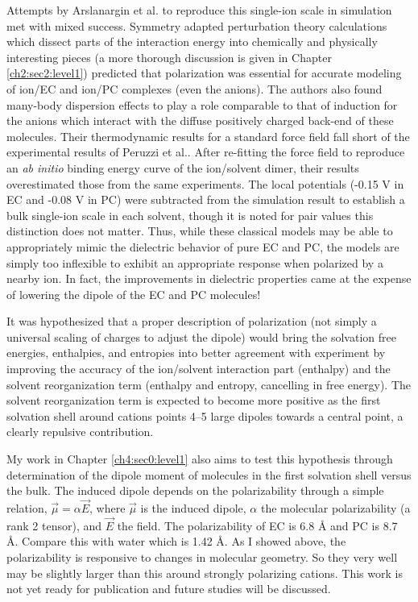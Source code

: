 \begin{intro}
   Attempts by Arslanargin et al. to reproduce this single-ion scale in simulation met with mixed success\cite{ayse2016ecpc}. Symmetry adapted perturbation theory calculations 
   which dissect parts of the interaction energy into chemically and physically interesting pieces (a more thorough discussion is given in Chapter \ref{ch2:sec2:level1}) 
   predicted that polarization was essential for accurate modeling of ion/EC and ion/PC complexes (even the anions). The authors also found many-body dispersion effects
   to play a role comparable to that of induction for the anions which interact with the diffuse positively charged back-end of these molecules\cite{ayse2016ecpc}. Their
   thermodynamic results for a standard force field fall short of the experimental results of Peruzzi et al.\cite{peruzzi2012hofmeister,peruzzi2015solvation}. After re-fitting
   the force field to reproduce an \emph{ab initio} binding energy curve of the ion/solvent dimer, their results overestimated those from the same experiments. The local
   potentials (-0.15 V in EC and -0.08 V in PC) were subtracted from the simulation result to establish a bulk single-ion scale in each solvent, though it is noted for pair 
   values this distinction does not matter. Thus, while these classical models may be able to appropriately mimic the dielectric behavior of pure EC and PC\cite{you2015dielectric},
   the models are simply too inflexible to exhibit an appropriate response when polarized by a nearby ion. In fact, the improvements in dielectric properties came at the
   expense of lowering the dipole of the EC and PC molecules\cite{you2015dielectric}!
   
   It was hypothesized that a proper description of polarization (not simply a universal scaling of charges to adjust the dipole) would bring the solvation free energies,
   enthalpies, and entropies into better agreement with experiment by improving the accuracy of the ion/solvent interaction part (enthalpy) and the solvent reorganization
   term (enthalpy and entropy, cancelling in free energy). The solvent reorganization term is expected to become more positive as the first solvation shell around cations
   points 4--5 large dipoles towards a central point, a clearly repulsive contribution. 
   
   My work in Chapter \ref{ch4:sec0:level1} also aims to test this hypothesis through determination of the dipole moment of molecules in the first solvation shell versus the 
   bulk. The induced dipole depends on the polarizability through a simple relation, $\vec{\mu} = \alpha\vec{E}$, where $\vec{\mu}$ is the induced dipole, $\alpha$ the molecular
   polarizability (a rank 2 tensor), and $\vec{E}$ the field. The polarizability of EC is 6.8 \AA{} and PC is 8.7 \AA{}. Compare this with water which is 1.42 \AA{}. 
   As I showed above, the polarizability is responsive to changes in molecular geometry. So they very well may be slightly larger than this around strongly polarizing cations. 
   This work is not yet ready for publication and future studies will be discussed.
   

\end{intro}
